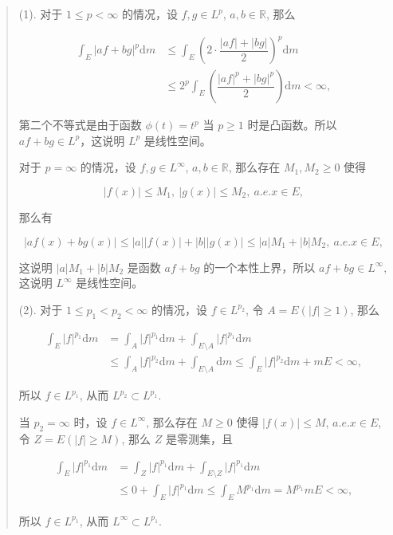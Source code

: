 \documentclass[
]{article}
\begin{document}
\begin{quote}
(1). 对于 \(1 \leqslant p < \infty\) 的情况，设 \(f, g \in L^p\),
\(a, b \in \mathbb{R}\), 那么

\[\begin{aligned}
\int_E \lvert af + bg \rvert^p \mathrm{d} m & \leqslant \int_E \left( 2 \cdot \dfrac{\lvert af \rvert + \lvert bg \rvert}{2} \right)^p \mathrm{d} m \\
& \leqslant 2^p \int_E \left( \dfrac{\lvert af \rvert^p + \lvert bg \rvert^p}{2} \right) \mathrm{d} m < \infty,
\end{aligned}\]

第二个不等式是由于函数 \(\phi(t) = t^p\) 当 \(p \geqslant 1\)
时是凸函数。所以 \(af + bg \in L^p\)，这说明 \(L^p\) 是线性空间。

对于 \(p = \infty\) 的情况，设 \(f, g \in L^\infty\),
\(a, b \in \mathbb{R}\), 那么存在 \(M_1, M_2 \geqslant 0\) 使得

\[\lvert f(x) \rvert \leqslant M_1, ~ \lvert g(x) \rvert \leqslant M_2, ~ a.e. x \in E,\]

那么有

\[\lvert af(x) + bg(x) \rvert \leqslant \lvert a \rvert \lvert f(x) \rvert + \lvert b \rvert \lvert g(x) \rvert \leqslant \lvert a \rvert M_1 + \lvert b \rvert M_2, ~ a.e. x \in E,\]

这说明 \(\lvert a \rvert M_1 + \lvert b \rvert M_2\) 是函数 \(af + bg\)
的一个本性上界，所以 \(af + bg \in L^\infty\), 这说明 \(L^\infty\)
是线性空间。

(2). 对于 \(1 \leqslant p_1 < p_2 < \infty\) 的情况，设
\(f \in L^{p_2}\), 令 \(A = E(\lvert f \rvert \geqslant 1)\), 那么

\[\begin{aligned}
\int_E \lvert f \rvert^{p_1} \mathrm{d} m & = \int_A \lvert f \rvert^{p_1} \mathrm{d} m + \int_{E \setminus A} \lvert f \rvert^{p_1} \mathrm{d} m \\
& \leqslant \int_A \lvert f \rvert^{p_2} \mathrm{d} m + \int_{E \setminus A} \mathrm{d} m \leqslant \int_E \lvert f \rvert^{p_2} \mathrm{d} m + m E < \infty,
\end{aligned}\]

所以 \(f \in L^{p_1}\), 从而 \(L^{p_2} \subset L^{p_1}\).

当 \(p_2 = \infty\) 时，设 \(f \in L^\infty\), 那么存在
\(M \geqslant 0\) 使得 \(\lvert f(x) \rvert \leqslant M\),
\(a.e. x \in E\), 令 \(Z = E(\lvert f \rvert \geqslant M)\), 那么 \(Z\)
是零测集，且

\[\begin{aligned}
\int_E \lvert f \rvert^{p_1} \mathrm{d} m & = \int_Z \lvert f \rvert^{p_1} \mathrm{d} m + \int_{E \setminus Z} \lvert f \rvert^{p_1} \mathrm{d} m \\
& \leqslant 0 + \int_E \lvert f \rvert^{p_1} \mathrm{d} m \leqslant \int_E M^{p_1} \mathrm{d} m = M^{p_1} m E < \infty,
\end{aligned}\]

所以 \(f \in L^{p_1}\), 从而 \(L^\infty \subset L^{p_1}\).
\end{quote}
\end{document}
